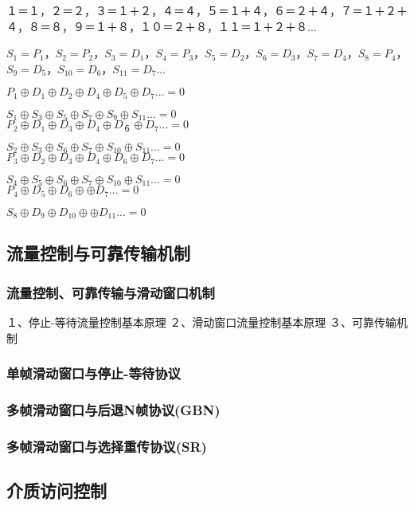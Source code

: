 \documentclass{ctexart}
\begin{document}
１＝１，２＝２，３＝１＋２，４＝４，５＝１＋４，６＝２＋４，７＝１＋２＋４，８＝８，９＝１＋８，１０＝２＋８，１１＝１＋２＋８...

$S_1=P_1$，$S_2=P_2$，$S_3=D_1$，$S_4=P_3$，$S_5=D_2$，$S_6=D_3$，$S_7=D_4$，$S_8=P_4$，$S_9=D_5$，$S_10=D_6$，$S_11=D_7$...

$P_1 \oplus D_1 \oplus D_2 \oplus D_4 \oplus D_5 \oplus D_7 ... = 0$

$S_1 \oplus S_3 \oplus S_5 \oplus S_7  \oplus S_9 \oplus S_11...=0$
\\

$P_2 \oplus D_1 \oplus D_3 \oplus D_4 \oplus D_６ \oplus D_7...=0$

$S_2 \oplus S_3 \oplus S_6 \oplus S_7  \oplus S_10 \oplus S_11...=0$
\\

$P_3 \oplus D_2 \oplus D_3 \oplus D_4 \oplus D_6 \oplus D_7...=0$

$S_4 \oplus S_5 \oplus S_6 \oplus S_7 \oplus S_10 \oplus S_11...=0$
\\

$P_4 \oplus D_5 \oplus D_6 \oplus \oplus D_7...=0$

$S_8 \oplus D_9 \oplus D_10 \oplus \oplus D_11...=0$

\subsection{流量控制与可靠传输机制}
\subsubsection{流量控制、可靠传输与滑动窗口机制}
１、停止-等待流量控制基本原理
２、滑动窗口流量控制基本原理
３、可靠传输机制
\subsubsection{单帧滑动窗口与停止-等待协议}

\subsubsection{多帧滑动窗口与后退N帧协议(GBN)}

\subsubsection{多帧滑动窗口与选择重传协议(SR)}

\subsection{介质访问控制}
\end{document}

